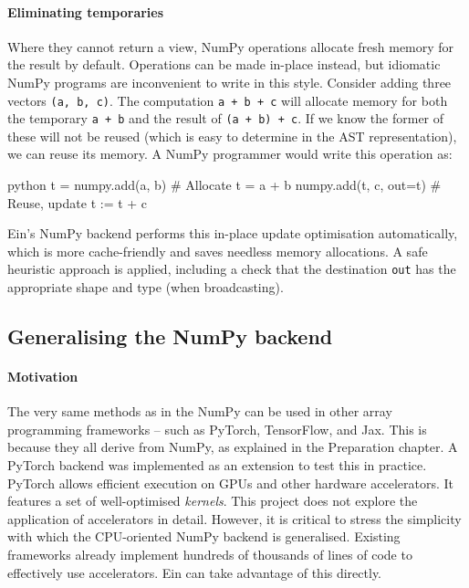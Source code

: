 \paragraph{Eliminating temporaries} Where they cannot return a view, NumPy operations allocate fresh memory for the result by default. Operations can be made in-place instead, but idiomatic NumPy programs are inconvenient to write in this style. Consider adding three vectors \texttt{(a, b, c)}. The computation \texttt{a + b + c} will allocate memory for both the temporary \texttt{a + b} and the result of \texttt{(a + b) + c}. If we know the former of these will not be reused (which is easy to determine in the AST representation), we can reuse its memory. A NumPy programmer would write this operation as:
\begin{center}
\begin{cminted}{python}
t = numpy.add(a, b)     # Allocate t = a + b
numpy.add(t, c, out=t)  # Reuse, update t := t + c
\end{cminted}
\end{center}
Ein's NumPy backend performs this in-place update optimisation automatically, which is more cache-friendly and saves needless memory allocations. A safe heuristic approach is applied, including a check that the destination \texttt{out} has the appropriate shape and type (when broadcasting).

\subsection{Generalising the NumPy backend}

\paragraph{Motivation} The very same methods as in the NumPy can be used in other array programming frameworks -- such as PyTorch, TensorFlow, and Jax. This is because they all derive from NumPy, as explained in the Preparation chapter. A PyTorch backend was implemented as an extension to test this in practice. PyTorch allows efficient execution on GPUs and other hardware accelerators. It features a set of well-optimised \textit{kernels}. This project does not explore the application of accelerators in detail. However, it is critical to stress the simplicity with which the CPU-oriented NumPy backend is generalised. Existing frameworks already implement hundreds of thousands of lines of code to effectively use accelerators. Ein can take advantage of this directly.

